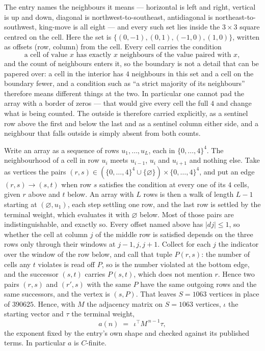 \documentclass[11pt,a4paper]{article}
\theoremstyle{plain}
\theoremstyle{definition}
\begin{document}
The entry names the neighbours it means --- horizontal is left and right, vertical is up and
down, diagonal is northwest-to-southeast, antidiagonal is northeast-to-southwest, king-move is
all eight --- and every such set lies inside the $3\times3$ square centred on the cell. Here
the set is $\{(0,-1), (0,1), (-1,0), (1,0)\}$, written as offsets (row, column) from the cell. Every cell carries
the condition
\[
\text{a cell of value }x\text{ has exactly }x\text{ neighbours of the value paired with }x,
\]
and the count of neighbours enters it, so the boundary is not a detail that can be papered
over: a cell in the interior has $4$ neighbours in this set and a cell on the boundary
fewer, and a condition such as ``a strict majority of its neighbours'' therefore means
different things at the two. In particular one cannot pad the array with a border of zeros ---
that would give every cell the full $4$ and change what is being counted. The outside is
therefore carried
explicitly, as a sentinel row above the first and below the last and as a sentinel column
either side, and a neighbour that falls outside is simply absent from both counts.

Write an array as a sequence of rows $u_1,\dots,u_L$, each in
$\{0,\dots,4\}^{4}$. The neighbourhood of a cell in row $u_i$ meets $u_{i-1}$,
$u_i$ and $u_{i+1}$ and nothing else. Take as vertices the pairs
$(r,s)\in(\{0,\dots,4\}^{4}\cup\{\varnothing\})\times\{0,\dots,4\}^{4}$,
and put an edge $(r,s)\to(s,t)$ when row $s$ satisfies the condition at every one of its
$4$ cells, given $r$ above and $t$ below. An array with $L$ rows is then a walk of length
$L-1$ starting at $(\varnothing,u_1)$, each step settling one row, and the last row is
settled by the terminal weight, which evaluates it with $\varnothing$ below. Most of those pairs are indistinguishable, and exactly so. Every offset named above has $|dj|\le 1$, so whether the cell at column $j$ of the middle row is satisfied depends on the three rows only through their windows at $j-1,j,j+1$. Collect for each $j$ the indicator over the window of the row below, and call that tuple $P(r,s)$: the number of cells any $t$ violates is read off $P$, so is the number violated at the bottom edge, and the successor $(s,t)$ carries $P(s,t)$, which does not mention $r$. Hence two pairs $(r,s)$ and $(r',s)$ with the same $P$ have the same outgoing rows and the same successors, and the vertex is $(s,P)$. That leaves $S=1063$ vertices in place of $390625$. Hence,
with $M$ the adjacency matrix on $S=1063$ vertices, $\iota$ the starting vector and $\tau$ the
terminal weight,
\[
a(n)\;=\;\,\iota^{\!\top}M^{\,n-1}\tau ,
\]
the exponent fixed by the entry's own shape and checked against its published terms. In
particular $a$ is $C$-finite.
\end{document}
